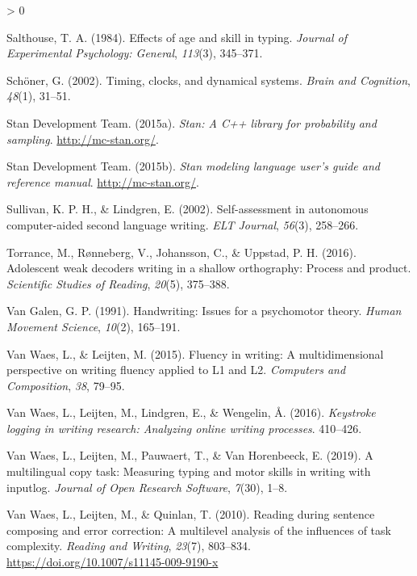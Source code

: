 \documentclass[
  english,
  man,mask,floatsintext]{apa7}
\newlength{\cslhangindent}
\newenvironment{CSLReferences}[2] %
 {%
  \setlength{\parindent}{0pt}
  \ifodd #1 \everypar{\setlength{\hangindent}{\cslhangindent}}\ignorespaces\fi
  \ifnum #2 > 0
  \setlength{\parskip}{#2\baselineskip}
  \fi
 }%
 {}
\begin{document}
\begin{CSLReferences}{1}{0}
\leavevmode\hypertarget{ref-salthouse1984effects}{}%
Salthouse, T. A. (1984). Effects of age and skill in typing. \emph{Journal of Experimental Psychology: General}, \emph{113}(3), 345--371.

\leavevmode\hypertarget{ref-schoner2002timing}{}%
Schöner, G. (2002). Timing, clocks, and dynamical systems. \emph{Brain and Cognition}, \emph{48}(1), 31--51.

\leavevmode\hypertarget{ref-rstan}{}%
Stan Development Team. (2015a). \emph{{S}tan: {A} {C++} library for probability and sampling}. \url{http://mc-stan.org/}.

\leavevmode\hypertarget{ref-rstan2}{}%
Stan Development Team. (2015b). \emph{Stan modeling language user's guide and reference manual}. \url{http://mc-stan.org/}.

\leavevmode\hypertarget{ref-sullivan2002self}{}%
Sullivan, K. P. H., \& Lindgren, E. (2002). Self-assessment in autonomous computer-aided second language writing. \emph{ELT Journal}, \emph{56}(3), 258--266.

\leavevmode\hypertarget{ref-torrance2016adolescent}{}%
Torrance, M., Rønneberg, V., Johansson, C., \& Uppstad, P. H. (2016). Adolescent weak decoders writing in a shallow orthography: Process and product. \emph{Scientific Studies of Reading}, \emph{20}(5), 375--388.

\leavevmode\hypertarget{ref-van1991handwriting}{}%
Van Galen, G. P. (1991). Handwriting: Issues for a psychomotor theory. \emph{Human Movement Science}, \emph{10}(2), 165--191.

\leavevmode\hypertarget{ref-van2015fluency}{}%
Van Waes, L., \& Leijten, M. (2015). Fluency in writing: A multidimensional perspective on writing fluency applied to {L1} and {L2}. \emph{Computers and Composition}, \emph{38}, 79--95.

\leavevmode\hypertarget{ref-van2016keystroke}{}%
Van Waes, L., Leijten, M., Lindgren, E., \& Wengelin, Å. (2016). \emph{Keystroke logging in writing research: Analyzing online writing processes}. 410--426.

\leavevmode\hypertarget{ref-van2019multilingual}{}%
Van Waes, L., Leijten, M., Pauwaert, T., \& Van Horenbeeck, E. (2019). A multilingual copy task: Measuring typing and motor skills in writing with inputlog. \emph{Journal of Open Research Software}, \emph{7}(30), 1--8.

\leavevmode\hypertarget{ref-van2010reading}{}%
Van Waes, L., Leijten, M., \& Quinlan, T. (2010). Reading during sentence composing and error correction: A multilevel analysis of the influences of task complexity. \emph{Reading and Writing}, \emph{23}(7), 803--834. \url{https://doi.org/10.1007/s11145-009-9190-x}


\end{CSLReferences}
\end{document}
